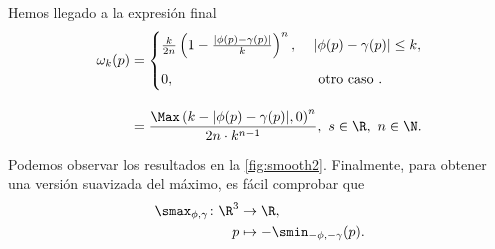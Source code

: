 Hemos llegado a la expresión final
\begin{align}
    \label{eq:correccion}
    \omega_k(p) &= \begin{cases}
        \frac{k}{2n}\left( 1-\frac{|\phi(p)-\gamma(p)|}{k} \right)^n,\ &|\phi(p)-\gamma(p)|\le k,\\[10pt]
        0,\ &\text{ otro caso }.
    \end{cases}\\[10pt] &= \frac{\Max\left( k - |\phi(p) - \gamma(p)|, 0\right)^n}{2n\cdot k^{n-1}}  ,\ s\in\R,\ n\in\N. 
\end{align}

Podemos observar los resultados en la \autoref{fig:smooth2}. Finalmente, para obtener una versión suavizada del máximo, es fácil comprobar que 
\begin{align*}
      \smax_{\phi,\gamma}\colon \R^3&\to \R,\\
      p &\mapsto -\smin_{-\phi,-\gamma}(p).
\end{align*}

